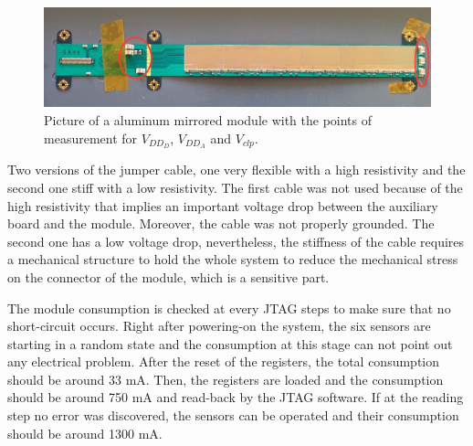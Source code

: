   \begin{figure}[!h]
    \centering
    \includegraphics[width=\textwidth]{Pictures/labTests/AM01_voltagePads.jpg}
    \caption{Picture of a aluminum mirrored module with the points of measurement for $V_{DD_D}$, $V_{DD_A}$ and $V_{clp}$.}
    \label{fig:voltagePads}
  \end{figure}

  Two versions of the jumper cable, one very flexible with a high resistivity and the second one stiff with a low resistivity.
  The first cable was not used because of the high resistivity that implies an important voltage drop between the auxiliary board and the module.
  Moreover, the cable was not properly grounded.
  The second one has a low voltage drop, nevertheless, the stiffness of the cable requires a mechanical structure to hold the whole system to reduce the mechanical stress on the connector of the module, which is a sensitive part.

  The module consumption is checked at every JTAG steps to make sure that no short-circuit occurs.
  Right after powering-on the system, the six sensors are starting in a random state and the consumption at this stage can not point out any electrical problem.
  After the reset of the registers, the total consumption should be around 33 mA.
  Then, the registers are loaded and the consumption should be around 750 mA and read-back by the JTAG software.
  If at the reading step no error was discovered, the sensors can be operated and their consumption should be around 1300 mA.



